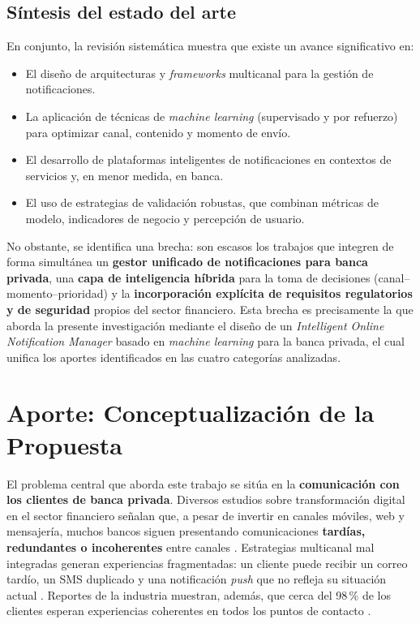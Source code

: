 \documentclass[conference]{IEEEtran}
\begin{document}
\subsection{Síntesis del estado del arte}

En conjunto, la revisión sistemática muestra que existe un avance significativo en:
\begin{itemize}
  \item El diseño de arquitecturas y \textit{frameworks} multicanal para la gestión de notificaciones.
  \item La aplicación de técnicas de \textit{machine learning} (supervisado y por refuerzo) para optimizar canal, contenido y momento de envío.
  \item El desarrollo de plataformas inteligentes de notificaciones en contextos de servicios y, en menor medida, en banca.
  \item El uso de estrategias de validación robustas, que combinan métricas de modelo, indicadores de negocio y percepción de usuario.
\end{itemize}

No obstante, se identifica una brecha: son escasos los trabajos que integren de forma simultánea un \textbf{gestor unificado de notificaciones para banca privada}, una \textbf{capa de inteligencia híbrida} para la toma de decisiones (canal--momento--prioridad) y la \textbf{incorporación explícita de requisitos regulatorios y de seguridad} propios del sector financiero. Esta brecha es precisamente la que aborda la presente investigación mediante el diseño de un \textit{Intelligent Online Notification Manager} basado en \textit{machine learning} para la banca privada, el cual unifica los aportes identificados en las cuatro categorías analizadas.




\section{Aporte: Conceptualizaci{\'o}n de la Propuesta}

El problema central que aborda este trabajo se sit{\'u}a en la \textbf{comunicaci{\'o}n con los clientes de banca privada}. Diversos estudios sobre transformaci{\'o}n digital en el sector financiero se{\~n}alan que, a pesar de invertir en canales m{\'o}viles, web y mensajer{\'i}a, muchos bancos siguen presentando comunicaciones \textbf{tard{\'i}as, redundantes o incoherentes} entre canales \cite{rahimi2021,torres2020}. Estrategias multicanal mal integradas generan experiencias fragmentadas: un cliente puede recibir un correo tard{\'i}o, un SMS duplicado y una notificaci{\'o}n \textit{push} que no refleja su situaci{\'o}n actual \cite{alzahrani2020}. Reportes de la industria muestran, adem{\'a}s, que cerca del 98\,\% de los clientes esperan experiencias coherentes en todos los puntos de contacto \cite{twilio2023}.
\end{document}
